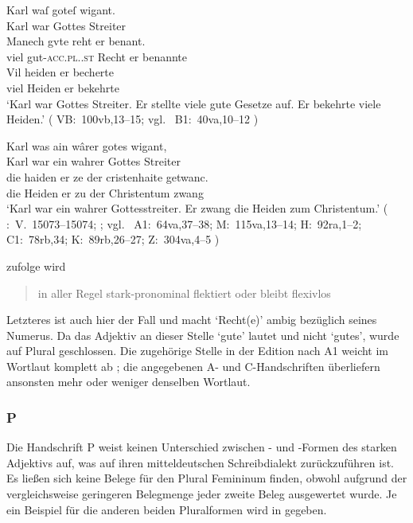 \begin{exe}
\ex \label{ex:kcvbaccplne}
	\begin{xlist}
	\ex \gll Karl waſ goteſ wigant. \\
			Karl war Gottes Streiter \\
	\sn \gll Manech gvte reht er benant. \\
			viel gut-\textsc{acc.pl.\NeutI.st} Recht er benannte \\
	\sn \gll Vil heiden er becherte \\
			viel Heiden er bekehrte \\
		\trans `Karl war Gottes Streiter. Er stellte viele gute
			Gesetze auf. Er bekehrte viele Heiden.'
			(%
				VB:~100vb,13--15; vgl.~%
				B1:~40va,10--12%
			)
		\label{ex:kcvbaccplne_2}

	\ex \gll Karl was ain wârer gotes wigant, \\
			Karl war ein wahrer Gottes Streiter \\
	\sn \gll die haiden er ze der cristenhaite getwanc. \\
			die Heiden er zu der Christentum zwang \\
		\trans `Karl war ein wahrer Gottesstreiter. Er zwang die Heiden
			zum Christentum.'
			(%
				\KC:~V.~15073--15074;
				\citet[354]{schroeder1895}; vgl.~%
				A1:~64va,37--38;
				M:~115va,13--14;
				H:~92ra,1--2;
				C1:~78rb,34;
				K:~89rb,26--27;
				Z:~304va,4--5%
			)
		\label{ex:kcvbaccplne_4}
		\\
	\end{xlist}
\end{exe}

\citet[585]{ksw2} zufolge wird  \blockquote{in aller Regel
stark-pronominal flektiert oder bleibt flexivlos}. Letzteres ist auch hier der
Fall und macht  `Recht(e)' ambig bezüglich seines
Numerus. Da das Adjektiv an dieser Stelle  `gute' lautet und nicht
 `gutes', wurde auf Plural geschlossen. Die zugehörige Stelle in der
Edition nach A1 weicht im Wortlaut komplett ab ; die
angegebenen A- und C-Handschriften überliefern ansonsten mehr oder weniger
denselben Wortlaut.

\subsubsection{P}
Die Handschrift P weist keinen Unterschied zwischen - und
-Formen des starken Adjektivs auf, was auf ihren
mitteldeutschen Schreibdialekt zurückzuführen ist. Es ließen
sich keine Belege für den Plural Femininum finden, obwohl aufgrund der
vergleichsweise geringeren Belegmenge jeder zweite Beleg ausgewertet wurde. Je
ein Beispiel für die anderen beiden Pluralformen wird in 
gegeben.

